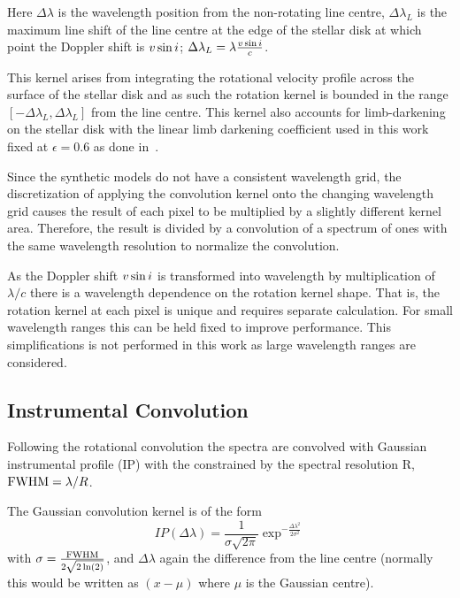 Here $\Delta\lambda$ is the wavelength position from the non-rotating line centre, $\Delta\lambda_{L}$ is the maximum line shift of the line centre at the edge of the stellar disk at which point the Doppler shift is  \(v\sin{i}\); $\Delta\lambda_{L} = \lambda \frac{v\sin{i}}{c}$.

This kernel arises from integrating the rotational velocity profile across the surface of the stellar disk and as such the rotation kernel is bounded in the range  $[-\Delta\lambda_L, \Delta\lambda_{L}]$ from the line centre.
This kernel also accounts for limb-darkening on the stellar disk with the linear limb darkening coefficient used in this work fixed at $\epsilon=0.6$ as done in~\citet{figueira_radial_2016}.

Since the synthetic models do not have a consistent wavelength grid, the discretization of applying the convolution kernel onto the changing wavelength grid causes the result of each pixel to be multiplied by a slightly different kernel area.
Therefore, the result is divided by a convolution of a spectrum of ones with the same wavelength resolution to normalize the convolution.

As the Doppler shift \(v\sin{i}\) is transformed into wavelength by multiplication of $\lambda  / c$ there is a wavelength dependence on the rotation kernel shape.
That is, the rotation kernel at each pixel is unique and requires separate calculation.
For small wavelength ranges this can be held fixed to improve performance.
This simplifications is not performed in this work as large wavelength ranges are considered.


\subsection{Instrumental Convolution}
Following the rotational convolution the spectra are convolved with Gaussian instrumental profile ({\textrm{IP}}) with the {\fwhm}  constrained by the spectral resolution R, $\textrm{FWHM}= \lambda/R$.

The Gaussian convolution kernel is of the form
\begin{equation}
IP(\Delta\lambda) = \frac{1}{\sigma \sqrt{2\pi}} \exp^{-\frac{{\Delta\lambda}^{2}}{2 {\sigma}^{2}}}    \label{eqn:IP_profile}
\end{equation}
with $\sigma = \frac{\textrm{FWHM}}{2\sqrt{2 \ln(2)}}$, and $\Delta \lambda$ again the difference from the line centre (normally this would be written as $(x-\mu)$ where $\mu$ is the Gaussian centre).

